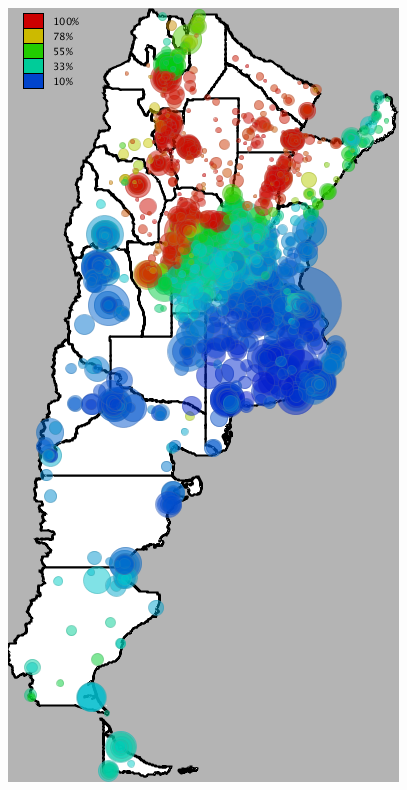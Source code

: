 \begin{figure}[h!]

\begin{minipage}{.495\linewidth}
\centering
  \includegraphics[width=0.90\linewidth]
  {figures/201112_hi_res_argentina_usuarios_proporcion_circulos_beta1/201112_hi_res_argentina_usuarios_proporcion_circulos_beta1}
  

\end{minipage}
\end{figure}
